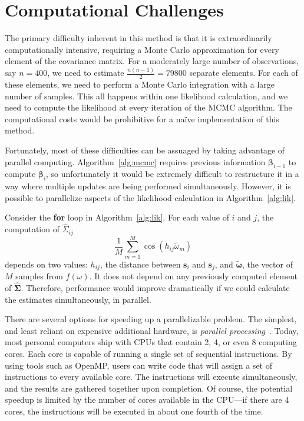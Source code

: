 \section{Computational Challenges} %
\label{sec:computational_challenges}

The primary difficulty inherent in this method is that it is extraordinarily computationally intensive, requiring a Monte Carlo approximation for every element of the covariance matrix. For a moderately large number of observations, say $n = 400$, we need to estimate $\frac{n(n-1)}{2} = 79800$ separate elements. For each of these elements, we need to perform a Monte Carlo integration with a large number of samples. This all happens within one likelihood calculation, and we need to compute the likelihood at every iteration of the MCMC algorithm. The computational costs would be prohibitive for a na\"{i}ve implementation of this method.

Fortunately, most of these difficulties can be assuaged by taking advantage of parallel computing. Algorithm~\ref{alg:mcmc} requires previous information $\bm{\beta}_{i-1}$ to compute $\bm{\beta}_i$, so unfortunately it would be extremely difficult to restructure it in a way where multiple updates are being performed simultaneously. However, it is possible to parallelize aspects of the likelihood calculation in Algorithm~\ref{alg:lik}.

Consider the \textbf{for} loop in Algorithm~\ref{alg:lik}. For each value of $i$ and $j$, the computation of $\widehat{\Sigma}_{ij}$
\[
	\frac{1}{M} \sum_{m=1}^M \cos(h_{ij} \widetilde{\omega}_m)
\]
depends on two values: $h_{ij}$, the distance between $\bm{s}_i$ and $\bm{s}_j$, and $\widetilde{\bm{\omega}}$, the vector of $M$ samples from $f(\omega)$. It does not depend on any previously computed element of $\widehat{\bm{\Sigma}}$. Therefore, performance would improve dramatically if we could calculate the estimates simultaneously, in parallel.

There are several options for speeding up a parallelizable problem. The simplest, and least reliant on expensive additional hardware, is \emph{parallel processing}~\cite{suchard2010understanding}. Today, most personal computers ship with CPUs that contain 2, 4, or even 8 computing cores. Each core is capable of running a single set of sequential instructions. By using tools such as OpenMP, users can write code that will assign a set of instructions to every available core. The instructions will execute simultaneously, and the results are gathered together upon completion. Of course, the potential speedup is limited by the number of cores available in the CPU---if there are 4 cores, the instructions will be executed in about one fourth of the time.

